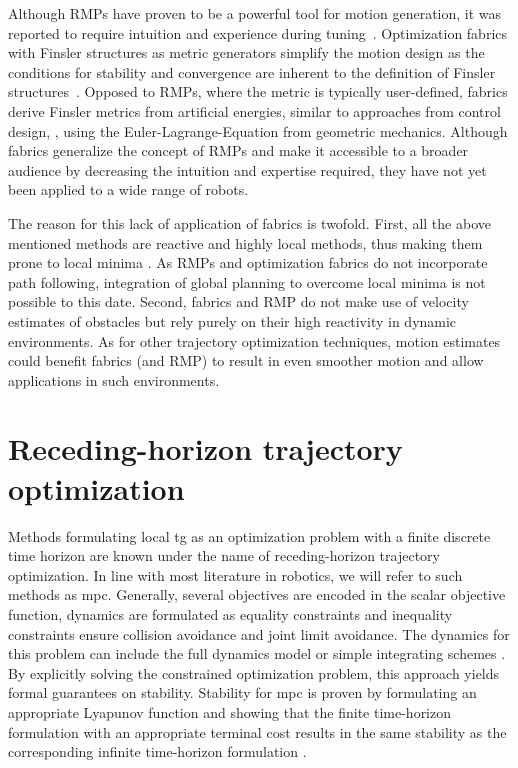 Although RMPs have proven to be a powerful tool for
motion generation, it was reported to require intuition and experience
during tuning~\cite{Ratliff2020}. Optimization fabrics with Finsler structures
as metric generators simplify the motion design as the conditions for stability
and convergence are inherent to the definition of Finsler
structures~\cite{Ratliff2020,Ratliff2021}. Opposed to RMPs, where the metric is
typically user-defined, fabrics derive Finsler metrics from artificial
energies, similar to approaches from control design, \cite{l2,l3}, using the
Euler-Lagrange-Equation from geometric mechanics. Although fabrics generalize
the concept of RMPs and make it accessible to a broader audience by
decreasing the intuition and expertise required, they have not yet been applied
to a wide range of robots. 

The reason for this lack of application of fabrics is twofold. First, all the
above mentioned methods are reactive and highly local methods, thus making them
prone to local minima \cite{bhardwaj2022storm}. As RMPs and optimization
fabrics do not incorporate path following, integration of global
planning to overcome local minima is not possible to this date. Second, fabrics
and RMP do not make use of velocity estimates of obstacles but rely purely on
their high reactivity in dynamic environments. As for other trajectory
optimization techniques, motion estimates could benefit fabrics (and RMP) to
result in even smoother motion and allow applications in such environments. 


\section{Receding-horizon trajectory optimization}%
\label{sec:receding_horizon_trajectory_optimization}

Methods formulating local \ac{tg} as an optimization problem with a finite
discrete time horizon are known under the name of receding-horizon trajectory
optimization. In line with most literature in robotics, we will refer to such
methods as \ac{mpc}.
Generally, several objectives are encoded in the scalar
objective function, dynamics
are formulated as equality constraints and inequality constraints ensure
collision avoidance and joint limit avoidance. The dynamics for this problem can
include the full dynamics model or simple integrating
schemes \cite{hewing2020learning}.
By explicitly solving the constrained optimization problem, this approach yields
formal guarantees on stability. Stability for \ac{mpc} is proven by formulating
an appropriate Lyapunov function and showing that the finite time-horizon
formulation with an appropriate terminal cost results in the same stability as
the corresponding infinite time-horizon formulation
\cite{l1,l4,keerthi1988optimal}. 

